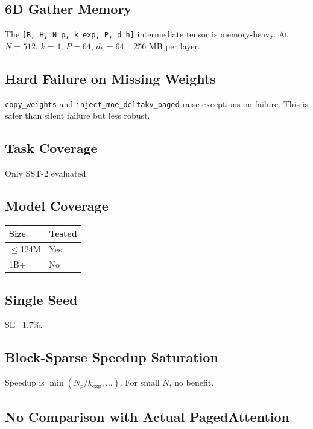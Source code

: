 \subsection{6D Gather Memory}

The \texttt{[B, H, N\_p, k\_exp, P, d\_h]} intermediate tensor is memory-heavy. At 
$N = 512$, $k = 4$, $P = 64$, $d_h = 64$: ~256 MB per layer.

\subsection{Hard Failure on Missing Weights}

\texttt{copy\_weights} and \texttt{inject\_moe\_deltakv\_paged} raise exceptions on failure. 
This is safer than silent failure but less robust.

\subsection{Task Coverage}

Only SST-2 evaluated.

\subsection{Model Coverage}

\begin{table}[H]
\centering
\small
\begin{tabular}{ll}
\toprule
\textbf{Size} & \textbf{Tested} \\
\midrule
$\le$124M & Yes \\
1B+ & No \\
\bottomrule
\end{tabular}
\end{table}

\subsection{Single Seed}

SE ~1.7\%.

\subsection{Block-Sparse Speedup Saturation}

Speedup is $\min(N_p/k_\text{exp}, \ldots)$. For small $N$, no benefit.

\subsection{No Comparison with Actual PagedAttention}

